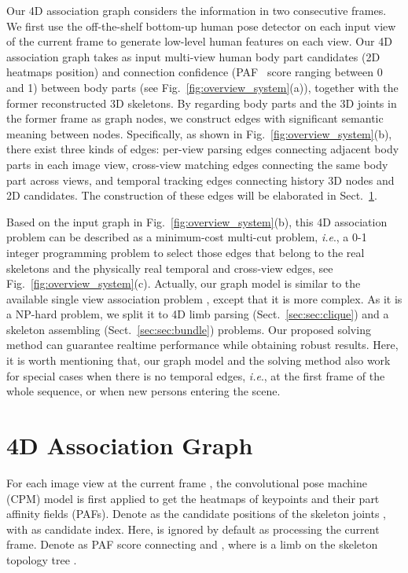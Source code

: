\documentclass[10pt,twocolumn,letterpaper]{article}
\begin{document}
Our 4D association graph considers the information in two consecutive frames. We first use the off-the-shelf bottom-up human pose detector \cite{cao2018openpose} on each input view of the current frame to generate low-level human features on each view. Our 4D association graph takes as input multi-view human body part candidates (2D heatmaps position) and connection confidence (PAF~\cite{cao2018openpose} score ranging between 0 and 1) between body parts (see Fig.~\ref{fig:overview_system}(a)), together with the former reconstructed 3D skeletons. By regarding body parts and the 3D joints in the former frame as graph nodes, we construct edges with significant semantic meaning between nodes. Specifically, as shown in Fig.~\ref{fig:overview_system}(b), there exist three kinds of edges: per-view parsing edges connecting adjacent body parts in each image view, cross-view matching edges connecting the same body part across views, and temporal tracking edges connecting history 3D nodes and 2D candidates. The construction of these edges will be elaborated in Sect.~\ref{sec:construct}.

Based on the input graph in Fig.~\ref{fig:overview_system}(b), this 4D association problem can be described as a minimum-cost multi-cut problem, \textit{i.e}., a 0-1 integer programming problem to select those edges that belong to the real skeletons and the physically real temporal and cross-view edges, see Fig.~\ref{fig:overview_system}(c). Actually, our graph model is similar to the available single view association problem \cite{cao2018openpose,deepercut}, except that it is more complex. As it is a NP-hard problem, we split it to 4D limb parsing (Sect.~\ref{sec:sec:clique}) and a skeleton assembling (Sect.~\ref{sec:sec:bundle}) problems. Our proposed solving method can guarantee realtime performance while obtaining robust results. Here, it is worth mentioning that, our graph model and the solving method also work for special cases when there is no temporal edges, \textit{i.e}., at the first frame of the whole sequence, or when new persons entering the scene. 

%
 \section{4D Association Graph}
\label{sec:construct}
For each image view  at the current frame , the convolutional pose machine (CPM) model \cite{wei2016convolutional,cao2018openpose} is first applied to get the heatmaps of keypoints and their part affinity fields (PAFs).
Denote  as the candidate positions of the skeleton joints , with  as candidate index. Here,  is ignored by default as processing the current frame. Denote  as PAF score connecting  and , where  is a limb on the skeleton topology tree .
\end{document}
